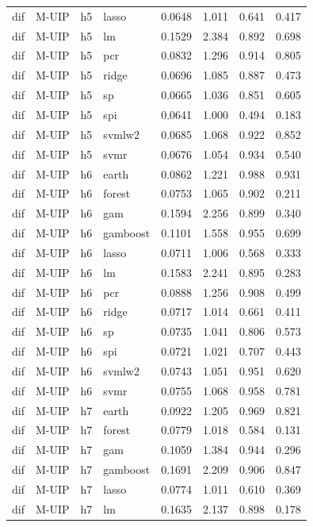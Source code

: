 \begin{ThreePartTable}
\begin{longtable}[t]{llclcccc}
dif & M-UIP & h5 & lasso & 0.0648 & 1.011 & 0.641 & 0.417\\
dif & M-UIP & h5 & lm & 0.1529 & 2.384 & 0.892 & 0.698\\
dif & M-UIP & h5 & pcr & 0.0832 & 1.296 & 0.914 & 0.805\\
dif & M-UIP & h5 & ridge & 0.0696 & 1.085 & 0.887 & 0.473\\
dif & M-UIP & h5 & sp & 0.0665 & 1.036 & 0.851 & 0.605\\
dif & M-UIP & h5 & spi & 0.0641 & 1.000 & 0.494 & 0.183\\
dif & M-UIP & h5 & svmlw2 & 0.0685 & 1.068 & 0.922 & 0.852\\
dif & M-UIP & h5 & svmr & 0.0676 & 1.054 & 0.934 & 0.540\\
\addlinespace
dif & M-UIP & h6 & earth & 0.0862 & 1.221 & 0.988 & 0.931\\
dif & M-UIP & h6 & forest & 0.0753 & 1.065 & 0.902 & 0.211\\
dif & M-UIP & h6 & gam & 0.1594 & 2.256 & 0.899 & 0.340\\
dif & M-UIP & h6 & gamboost & 0.1101 & 1.558 & 0.955 & 0.699\\
dif & M-UIP & h6 & lasso & 0.0711 & 1.006 & 0.568 & 0.333\\
dif & M-UIP & h6 & lm & 0.1583 & 2.241 & 0.895 & 0.283\\
dif & M-UIP & h6 & pcr & 0.0888 & 1.256 & 0.908 & 0.499\\
dif & M-UIP & h6 & ridge & 0.0717 & 1.014 & 0.661 & 0.411\\
dif & M-UIP & h6 & sp & 0.0735 & 1.041 & 0.806 & 0.573\\
dif & M-UIP & h6 & spi & 0.0721 & 1.021 & 0.707 & 0.443\\
dif & M-UIP & h6 & svmlw2 & 0.0743 & 1.051 & 0.951 & 0.620\\
dif & M-UIP & h6 & svmr & 0.0755 & 1.068 & 0.958 & 0.781\\
\addlinespace
dif & M-UIP & h7 & earth & 0.0922 & 1.205 & 0.969 & 0.821\\
dif & M-UIP & h7 & forest & 0.0779 & 1.018 & 0.584 & 0.131\\
dif & M-UIP & h7 & gam & 0.1059 & 1.384 & 0.944 & 0.296\\
dif & M-UIP & h7 & gamboost & 0.1691 & 2.209 & 0.906 & 0.847\\
dif & M-UIP & h7 & lasso & 0.0774 & 1.011 & 0.610 & 0.369\\
dif & M-UIP & h7 & lm & 0.1635 & 2.137 & 0.898 & 0.178\\

\end{longtable}
\end{ThreePartTable}
